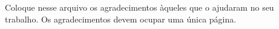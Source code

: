 Coloque nesse arquivo os agradecimentos àqueles que o ajudaram no seu trabalho. Os agradecimentos devem ocupar uma única página.
